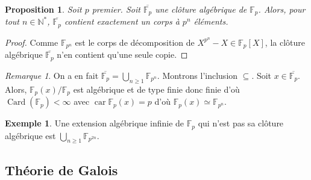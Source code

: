 \documentclass{article}
\newcommand{\N}{\mathbb{N}}
\newcommand{\F}{\mathbb{F}}
\DeclareMathOperator{\Card}{Card}
\DeclareMathOperator{\car}{car}
\theoremstyle{plain}
\newtheorem{proposition}[theorem]{Proposition}
\theoremstyle{definition}
\newtheorem{example}[theorem]{Exemple}
\theoremstyle{remark}
\newtheorem*{remark}{Remarque}
\begin{document}
\begin{proposition}
    Soit $p$ premier. Soit $\overline{\F_p}$ une clôture algébrique de $\F_p$. Alors, pour tout $n \in \N^*$, $\overline{\F_p}$ contient exactement un corps à $p^n$ éléments.
\end{proposition}

\begin{proof}
    Comme $\F_{p^n}$ est le corps de décomposition de $X^{p^n} - X \in \F_p [X]$, la clôture algébrique $\overline{\F_p}$ n'en contient qu'une seule copie.
\end{proof}

\begin{remark}
    On a en fait $\overline{\F_p} = \bigcup\limits_{n\ge 1} \F_{p^n}$. Montrons l'inclusion $\subseteq$. Soit $x\in \overline{\F_p}$. Alors, $\F_p (x) / \F_p$ est algébrique et de type finie donc finie d'où $\Card(\F_p) < \infty$ avec $\car \F_p (x) = p$ d'où $\F_p (x) \simeq \F_{p^n}$.
\end{remark}

\begin{example}
    Une extension algébrique infinie de $\F_p$ qui n'est pas sa clôture algébrique est $\bigcup\limits_{n\ge 1} \F_{p^{2n}}$.
\end{example}

\subsection{Théorie de Galois}
\end{document}

